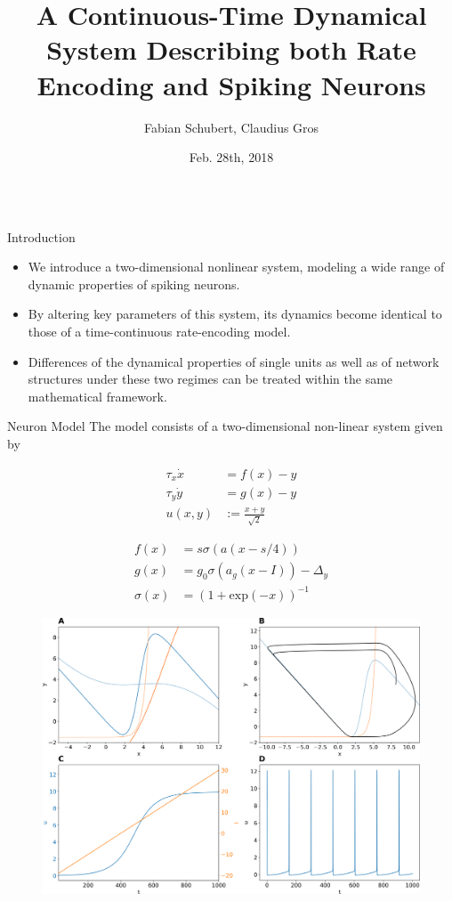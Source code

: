 \documentclass{beamer}
\title{A Continuous-Time Dynamical System Describing both Rate Encoding and Spiking Neurons}
\author{Fabian Schubert, Claudius Gros}
\institute{Institute for Theoretical Physics, Goethe University Frankfurt a.M.}
\date[Feb. 28th, 2018]{Feb. 28th, 2018}
\begin{document}
\begin{frame}[t]
\begin{columns}
\begin{column}{.45\textwidth}
\begin{block}{Introduction}
\begin{itemize}
\item We introduce a two-dimensional nonlinear system, modeling a wide range of dynamic 
properties of spiking neurons.
\item By altering key parameters of this system, its dynamics become identical to those of a 
time-continuous rate-encoding model.
\item Differences of the dynamical properties of single units as well as of network structures under 
these two regimes can be treated within the same mathematical framework.
\end{itemize}
\end{block}
\begin{block}{Neuron Model}
The model consists of a two-dimensional non-linear system given by
\begin{minipage}[t]{.5\linewidth}
\begin{align*}
\tau_x \dot{x} &= f(x) - y  \\ 
\tau_y \dot{y} &= g(x) - y \\
u(x,y) &:= \frac{x+y}{\sqrt{2}}
\end{align*}
\end{minipage}%
\begin{minipage}[t]{.5\linewidth}
\begin{align*}
f(x) &= s \sigma \left(a\left(x-s/4\right)\right)  \\
g(x) &= g_0 \sigma\left(a_g\left(x-I\right)\right) - \Delta_y \\
\sigma(x) &= \left(1+\mathrm{exp}(-x)\right)^{-1}
\end{align*}
\end{minipage}
\begin{figure}
\centering
\includegraphics[width=\textwidth]{../figures/graphics/dynamics_combined_figure.png}

\end{figure}
\end{block}
\end{column}
\end{columns}
\end{frame}
\end{document}

